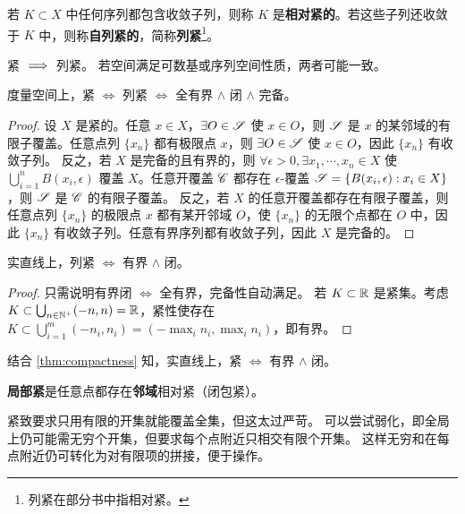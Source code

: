 \begin{definition}
    若 $K\subset X$ 中任何序列都包含收敛子列，则称 $K$ 是\textbf{相对紧的}。若这些子列还收敛于 $K$ 中，则称\textbf{自列紧的}，简称\textbf{列紧}\footnote{列紧在部分书中指相对紧。}。
\end{definition}

\begin{remark}
    紧 $\implies$ 列紧。
    若空间满足可数基或序列空间性质，两者可能一致。
\end{remark}

\begin{theorem}\label{thm:compactness}
    度量空间上，紧 $\iff$ 列紧 $\iff$ 全有界 $\land$ 闭 $\land$ 完备。
\end{theorem}
\begin{proof}
    设 $X$ 是紧的。任意 $x\in X$，$\exists O\in\mathscr S$ 使 $x\in O$，则 $\mathscr S$ 是 $x$ 的某邻域的有限子覆盖。任意点列 $\{x_n\}$ 都有极限点 $x$，则 $\exists O\in\mathscr S$ 使 $x\in O$，因此 $\{x_n\}$ 有收敛子列。
    反之，若 $X$ 是完备的且有界的，则 $\forall \epsilon>0,\exists x_1,\cdots,x_n\in X$
    使 $\bigcup_{i=1}^n B(x_i,\epsilon)$ 覆盖 $X$。任意开覆盖 $\mathscr C$ 都存在 $\epsilon$-覆盖 $\mathscr S=\{B(x_i,\epsilon):x_i\in X\}$，则 $\mathscr S$ 是 $\mathscr C$ 的有限子覆盖。
    反之，若 $X$ 的任意开覆盖都存在有限子覆盖，则任意点列 $\{x_n\}$ 的极限点 $x$ 都有某开邻域 $O$，使 $\{x_n\}$ 的无限个点都在 $O$ 中，因此 $\{x_n\}$ 有收敛子列。任意有界序列都有收敛子列，因此 $X$ 是完备的。
\end{proof}

\begin{example}
    实直线上，列紧 $\iff$ 有界 $\land$ 闭。
\end{example}
\begin{proof}
    只需说明有界闭 $\iff$ 全有界，完备性自动满足。
    若 $K\subset \mathbb{R}$ 是紧集。考虑 $K\subset\bigcup_{n\in\mathbb{N}^+}(-n,n)=\mathbb{R}$，紧性使存在 $K\subset \bigcup_{i=1}^m(-n_i,n_i)=(-\max_i{n_i},\max_i{n_i})$，即有界。
\end{proof}

\begin{example}
    结合 \ref{thm:compactness} 知，实直线上，紧 $\iff$ 有界 $\land$ 闭。
\end{example}

\begin{definition}
    \textbf{局部紧}是任意点都存在\textbf{邻域}相对紧（闭包紧）。
\end{definition}

紧致要求只用有限的开集就能覆盖全集，但这太过严苛。
可以尝试弱化，即全局上仍可能需无穷个开集，但要求每个点附近只相交有限个开集。
这样无穷和在每点附近仍可转化为对有限项的拼接，便于操作。

